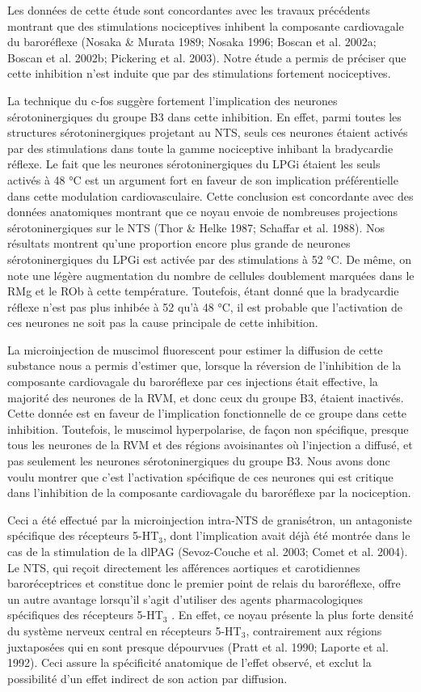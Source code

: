 \documentclass[a4paper,12pt,twoside]{report}
\begin{document}
Les données de cette étude sont concordantes avec les travaux précédents montrant que des stimulations nociceptives inhibent la composante cardiovagale du baroréflexe (Nosaka \& Murata 1989; Nosaka 1996; Boscan et al. 2002a; Boscan et al. 2002b; Pickering et al. 2003). Notre étude a permis de préciser que cette inhibition n’est induite que par des stimulations fortement nociceptives. 

La technique du c-fos suggère fortement l’implication des neurones sérotoninergiques du groupe B3 dans cette inhibition. En effet, parmi toutes les structures sérotoninergiques projetant au NTS, seuls ces neurones étaient activés par des stimulations dans toute la gamme nociceptive inhibant la bradycardie réflexe. Le fait que les neurones sérotoninergiques du LPGi étaient les seuls activés à 48 °C est un argument fort en faveur de son implication préférentielle dans cette modulation cardiovasculaire. Cette conclusion est concordante avec des données anatomiques montrant que ce noyau envoie de nombreuses projections sérotoninergiques sur le NTS (Thor \& Helke 1987; Schaffar et al. 1988). Nos résultats montrent qu’une proportion encore plus grande de neurones sérotoninergiques du LPGi est activée par des stimulations à 52 °C. De même, on note une légère augmentation du nombre de cellules doublement marquées dans le RMg et le ROb à cette température. Toutefois, étant donné que la bradycardie réflexe n’est pas plus inhibée à 52 qu’à 48 °C, il est probable que l’activation de ces neurones ne soit pas la cause principale de cette inhibition.

La microinjection de muscimol fluorescent pour estimer la diffusion de cette substance nous a permis d’estimer que, lorsque la réversion de l’inhibition de la composante cardiovagale du baroréflexe par ces injections était effective, la majorité des neurones de la RVM, et donc ceux du groupe B3, étaient inactivés. Cette donnée est en faveur de l’implication fonctionnelle de ce groupe dans cette inhibition. Toutefois, le muscimol hyperpolarise, de façon non spécifique, presque tous les neurones de la RVM et des régions avoisinantes où l’injection a diffusé, et pas seulement les neurones sérotoninergiques du groupe B3. Nous avons donc voulu montrer que c’est l’activation spécifique de ces neurones qui est critique dans l’inhibition de la composante cardiovagale du baroréflexe par la nociception. 

Ceci a été effectué par la microinjection intra-NTS de granisétron, un antagoniste spécifique des récepteurs 5-HT$_{3}$, dont l’implication avait déjà été montrée dans le cas de la stimulation de la dlPAG (Sevoz-Couche et al. 2003; Comet et al. 2004). Le NTS, qui reçoit directement les afférences aortiques et carotidiennes baroréceptrices et constitue donc le premier point de relais du baroréflexe, offre un autre avantage lorsqu’il s’agit d’utiliser des agents pharmacologiques spécifiques des récepteurs 5-HT$_{3}$ . En effet, ce noyau présente la plus forte densité du système nerveux central en récepteurs 5-HT$_{3}$, contrairement aux régions juxtaposées qui en sont presque dépourvues (Pratt et al. 1990; Laporte et al. 1992). Ceci assure la spécificité anatomique de l’effet observé, et exclut la possibilité d’un effet indirect de son action par diffusion. 
\end{document}
